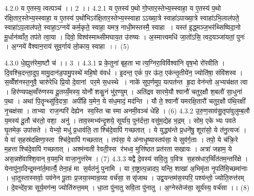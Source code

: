 4.2.0
य ए॒तस्य॒ त्वत्पञ्च॑ ।। 2 ।।
4.2.1
य ए॒तस्य॑ प॒थो गो॒प्तार॒स्तेभ्य॒स्स्वाहा॒ य ए॒तस्य॑ प॒थो र॑क्षि॒तार॒स्तेभ्य॒स्स्वाहा॒ य ए॒तस्य॑ प॒थो॑भिऽर॑क्षि॒तार॒स्तेभ्य॒स्स्वाहाऽऽख्या॒त्रे स्वाहा॑ऽपाख्या॒त्रे स्वाहा॑ऽभि॒लाल॑पते॒ स्वाहा॑ऽप॒लाल॑पते॒ स्वाहा॒ऽग्नये॑ कर्म॒कृते॒ स्वाहा॒ यमत्र॒ नाधी॒मस्तस्मै॒ स्वाहा । यस्त॑ इ॒द्ध्मञ्ज॒भर॑थ्सिष्विदा॒नो मू॒र्धान॑व्वाँत॒ तप॑ते त्वा॒या । दिवो॒ विश्व॑स्माथ्सीमघाय॒त उ॑रुष्यः । अ॒स्मात्त्वमधि॑ जा॒तो॑ऽसि॒ त्वद॒यञ्जा॑यतां॒ पुनः॑ । अ॒ग्नये॑ वैश्वान॒राय॑ सुव॒र्गाय॑ लो॒काय॒ स्वाहा ।। (5)
\anuvakamend

4.3.0
धे॒ह्युत्त॑रेमा॒ष्टौ च॑ ।। 3 ।
4.3.1
प्र के॒तुना॑ बृह॒ता भात्य॒ग्निरा॒विर्विश्वा॑नि वृष॒भो रो॑रवीति । दि॒वश्चि॒दन्ता॒दुप॒ मामु॒दान॑ड॒पामु॒पस्थे॑ महि॒षो व॑वर्ध । इ॒दन्त॒ एकं॑ प॒र ऊ॑त॒ एक॑न्तृ॒तीये॑न॒ ज्योति॑षा॒ संवि॑शस्व । स॒व्वेँश॑नस्त॒नुवै॒ चारु॑रेधि प्रि॒यो दे॒वानां पर॒मे स॒धस्थे । नाके॑ सुप॒र्णमुप॒ यत्पत॑न्त हृ॒दा वेन॑न्तो अ॒भ्यच॑क्षत त्वा । हिर॑ण्यपक्ष॒व्वँरु॑णस्य दू॒तय्यँ॒मस्य॒ योनौ॑ शकु॒नं भु॑र॒ण्युम् । अति॑द्रव सारमे॒यौ श्वानौ॑ चतुर॒क्षौ श॒बलौ॑ सा॒धुना॑ प॒था । अथा॑ पि॒तॄन्थ्सु॑वि॒दत्रा॒ अपी॑हि य॒मेन॒ ये स॑ध॒मादं॒ मद॑न्ति । यौ ते॒ श्वानौ॑ यमरक्षि॒तारौ॑ चतुर॒क्षौ प॑थि॒रक्षी॑ नृ॒चक्ष॑सा । ताभ्या राज॒न्परि॑ देह्येन स्व॒स्ति चास्मा अनमी॒वञ्च॑ धेहि । (6)
4.3.2
उ॒रु॒ण॒साव॑सु॒तृपा॑वुलुम्ब॒लौ य॒मस्य॑ दू॒तौ च॑रतो॒ वशा॒ अनु॑ । ताव॒स्मभ्य॑न्दृ॒शये॒ सूर्या॑य॒ पुन॑र्दत्ता॒ वसु॑म॒द्येह भ॒द्रम् । सोम॒ एकेभ्यः पवते घृ॒तमेक॒ उपा॑सते । येभ्यो॒ मधु॑ प्र॒धाव॑ति॒ ताश्चि॑दे॒वापि॑ गच्छतात् । ये युद्ध्य॑न्ते प्र॒धने॑षु॒ शूरा॑सो॒ ये त॑नु॒त्यजः॑ । ये वा॑ स॒हस्र॑दक्षिणा॒स्ता श्चि॑दे॒वापि॑ गच्छतात् । तप॑सा॒ ये अ॑नाधृ॒ष्यास्तप॑सा॒ ये सुव॑र्ग॒ताः । तपो॒ ये च॑क्रि॒रे म॒हत्ताश्चि॑दे॒वापि॑ गच्छतात् । अश्म॑न्वती रेवती॒स्स र॑भध्व॒ मुत्ति॑ष्ठत प्रत॑रता सखायः । अत्रा॑ जहाम॒ ये अस॒न्नशे॑वाश्शि॒वान् व॒यम॒भि वाजा॒नुत्त॑रेम । (7)
4.3.3
यद्वै दे॒वस्य॑ सवि॒तुः प॒वित्र स॒हस्र॑धार॒व्विँत॑तम॒न्तरि॑क्षे । येनापु॑ना॒दिन्द्र॒मना॑र्त॒मार्त्यै॒ तेना॒हं मा स॒र्वत॑नुं पुनामि । या रा॒ष्ट्रात्प॒न्नादप॒ यन्ति॒ शाखा॑ अ॒भिमृ॑ता नृ॒पति॑मि॒च्छमा॑नाः । धा॒तुस्तास्सर्वाः॒ पव॑नेन पू॒ताः प्र॒जया॒स्मान्र॒य्या वर्च॑सा॒ ससृ॑जाथ । उद्व॒यन्तम॑स॒स्परि॒ पश्य॑न्तो॒ ज्योति॒रुत्त॑रम् । दे॒वन्दे॑व॒त्रा सूर्य॒मग॑न्म॒ ज्योति॑रुत्त॒मम् । धा॒ता पु॑नातु सवि॒ता पु॑नातु । अ॒ग्नेस्तेज॑सा॒ सूर्य॑स्य॒ वर्च॑सा ।। (8)
\anuvakamend

